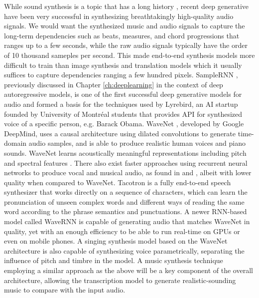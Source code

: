 While sound synthesis is a topic that has a long history \cite{cook2002synthesis}, recent deep generative have been very successful in synthesizing breathtakingly high-quality audio signals.
We would want the synthesized music and audio signals to capture the long-term dependencies such as beats, measures, and chord progressions that ranges up to a few seconds, while the raw audio signals typically have the order of 10 thousand sameples per second.
This made end-to-end synthesis models more difficult to train than image synthesis and translation models which it usually suffices to capture dependencies ranging a few hundred pixels.
SampleRNN \cite{mehri2016samplernn}, previously discussed in Chapter \ref{ch:deeplearning} in the context of deep autoregressive models, is one of the first successful deep generative models for audio and formed a basis for the techniques used by Lyrebird, an AI startup founded by University of Montr\'{e}al students that provides API for synthesized voice of a specific person, e.g. Barack Obama.
WaveNet \cite{oord2016wavenet}, developed by Google DeepMind, uses a causal architecture using dilated convolutions to generate time-domain audio samples, and is able to produce realistic human voices and piano sounds.
WaveNet learns acoustically meaningful representations including pitch and spectral features \cite{hua2018wavenet}.
There also exist faster approaches using recurrent neural networks to produce vocal and musical audio, as found in \cite{nayebi2015gruv} and \cite{kalingeri2016generation}, albeit with lower quality when compared to WaveNet.
Tacotron \cite{wang2017tacotron, shen2018tacotron} is a fully end-to-end speech synthesizer that works directly on a sequence of characters, which can learn the pronunciation of unseen complex words and different ways of reading the same word according to the phrase semantics and punctuations.
A newer RNN-based model called WaveRNN \cite{kalchbrenner2018wavernn} is capable of generating audio that matches WaveNet in quality, yet with an enough efficiency to be able to run real-time on GPUs or even on mobile phones.
A singing synthesis model \cite{blaauw2017singing} based on the WaveNet architecture is also capable of synthesizing voice parametrically, separating the influence of pitch and timbre in the model.
A music synthesis technique employing a similar approach as the above will be a key component of the overall architecture, allowing the transcription model to generate realistic-sounding music to compare with the input audio.


